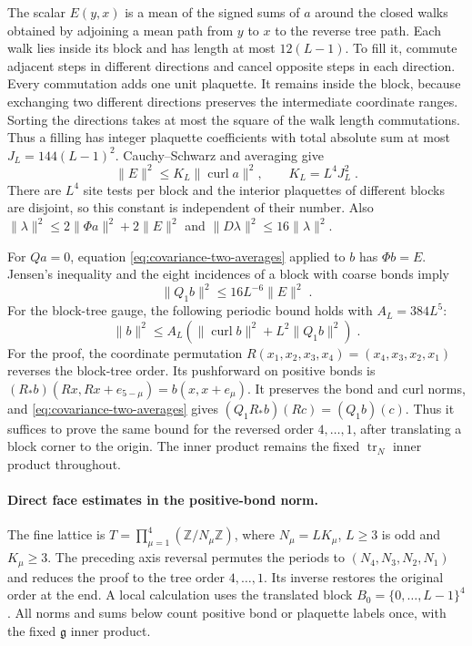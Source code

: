 \documentclass[11pt]{article}
\newcommand{\tr}{\operatorname{tr}}
\begin{document}
The scalar $E(y,x)$ is a mean of the signed sums of $a$ around the closed walks obtained by adjoining a mean path from $y$ to $x$ to the reverse tree path. Each walk lies inside its block and has length at most $12(L-1)$. To fill it, commute adjacent steps in different directions and cancel opposite steps in each direction. Every commutation adds one unit plaquette. It remains inside the block, because exchanging two different directions preserves the intermediate coordinate ranges. Sorting the directions takes at most the square of the walk length commutations. Thus a filling has integer plaquette coefficients with total absolute sum at most $J_L=144(L-1)^2$. Cauchy--Schwarz and averaging give
\begin{equation}\label{eq:covariance-filling-bound}
    \|E\|^2\leq K_L\|\operatorname{curl}a\|^2,
    \qquad K_L=L^4J_L^2\;.
\end{equation}
There are $L^4$ site tests per block and the interior plaquettes of different blocks are disjoint, so this constant is independent of their number. Also $\|\lambda\|^2\leq 2\|\Phi a\|^2+2\|E\|^2$ and $\|D\lambda\|^2\leq 16\|\lambda\|^2$.

For $Qa=0$, equation \eqref{eq:covariance-two-averages} applied to $b$ has $\Phi b=E$. Jensen's inequality and the eight incidences of a block with coarse bonds imply
\begin{equation}\label{eq:covariance-constraint-error}
    \|Q_1b\|^2\leq 16L^{-6}\|E\|^2\;.
\end{equation}
For the block-tree gauge, the following periodic bound holds with $A_L=384L^5$:
\begin{equation}\label{eq:covariance-hard-bound}
    \|b\|^2\leq A_L
        (\|\operatorname{curl}b\|^2+L^2\|Q_1b\|^2)\;.
\end{equation}
For the proof, the coordinate permutation $R(x_1,x_2,x_3,x_4)=(x_4,x_3,x_2,x_1)$ reverses the block-tree order. Its pushforward on positive bonds is $(R_*b)(Rx,Rx+e_{5-\mu})=b(x,x+e_\mu)$. It preserves the bond and curl norms, and \eqref{eq:covariance-two-averages} gives $(Q_1R_*b)(Rc)=(Q_1b)(c)$. Thus it suffices to prove the same bound for the reversed order $4,\ldots,1$, after translating a block corner to the origin. The inner product remains the fixed $\tr_N$ inner product throughout.

\paragraph{Direct face estimates in the positive-bond norm.}
The fine lattice is $T=\prod_{\mu=1}^4(\mathbb Z/N_\mu\mathbb Z)$, where $N_\mu=LK_\mu$, $L\geq 3$ is odd and $K_\mu\geq 3$. The preceding axis reversal permutes the periods to $(N_4,N_3,N_2,N_1)$ and reduces the proof to the tree order $4,\ldots,1$. Its inverse restores the original order at the end. A local calculation uses the translated block $B_0=\{0,\ldots,L-1\}^4$. All norms and sums below count positive bond or plaquette labels once, with the fixed $\mathfrak g$ inner product.
\end{document}
